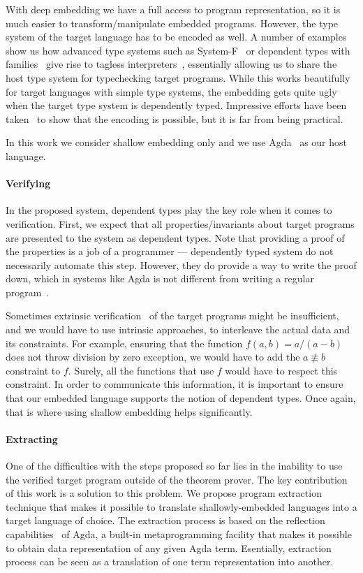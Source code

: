 \documentclass[acmsmall,review,anonymous]{acmart}\settopmatter{printfolios=true,printccs=false,printacmref=false}
\begin{document}
With deep embedding we have a full access to program representation, so it is
much easier to transform/manipulate embedded programs.  However, the type system
of the target language has to be encoded as well.  A number
of examples~\cite{} show us how advanced type systems such as
System-F~\cite{} or dependent types with families~\cite{} give rise to tagless 
interpreters~\cite{}, essentially allowing us to share the host type system for
typechecking target programs.  While this works beautifully for target languages with
simple type systems, the embedding gets quite ugly~\cite{} when the target type
system is dependently typed.  Impressive efforts have been taken~\cite{} to show
that the encoding is possible, but it is far from being practical.

In this work we consider shallow embedding only and we use Agda~\cite{} as our
host language.

\paragraph{Verifying} In the proposed system, dependent types play the key role
when it comes to verification.  First, we expect that all properties/invariants
about target programs are presented to the system as dependent types.  Note that
providing a proof of the properties is a job of a programmer --- dependently
typed system do not necessarily automate this step.  However, they do provide a
way to write the proof down, which in systems like Agda is not different from
writing a regular program~\cite{}.

Sometimes extrinsic verification~\cite{} of the target programs might be
insufficient, and we would have to use intrinsic approaches, \ie{} to interleave
the actual data and its constraints.  For example, ensuring that the function
$f(a, b) = a / (a - b)$ does not throw division by zero exception, we would have
to add the $a \nequiv b$ constraint to $f$.  Surely, all the functions that use
$f$ would have to respect this constraint.  In order to communicate this information,
it is important to ensure that our embedded language supports the notion of
dependent types.  Once again, that is where using shallow embedding helps
significantly.

\paragraph{Extracting}
One of the difficulties with the steps proposed so far lies in the inability
to use the verified target program outside of the theorem prover.  The key
contribution of this work is a solution to this problem.  We propose program extraction
technique that makes it possible to translate shallowly-embedded languages into
a target language of choice.  The extraction process is based on the reflection
capabilities~\cite{} of Agda, \ie{} a built-in metaprogramming facility that makes
it possible to obtain data representation of any given Agda term.  Esentially,
extraction process can be seen as a translation of one term representation
into another.
\end{document}

